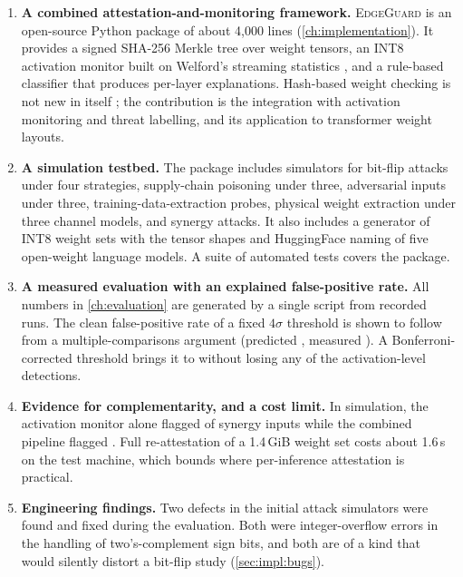 \begin{enumerate}[leftmargin=*]
  \item \textbf{A combined attestation-and-monitoring framework.} \textsc{EdgeGuard} is an
        open-source Python package of about 4{,}000 lines (\cref{ch:implementation}). It
        provides a signed SHA-256 Merkle tree over weight tensors, an INT8 activation monitor
        built on Welford's streaming statistics \cite{welford1962note}, and a rule-based
        classifier that produces per-layer explanations. Hash-based weight checking is not new
        in itself \cite{javaheripi2021hashtag,guo2021modelshield}; the contribution is the
        integration with activation monitoring and threat labelling, and its application to
        transformer weight layouts.
  \item \textbf{A simulation testbed.} The package includes simulators for bit-flip attacks
        under four strategies, supply-chain poisoning under three, adversarial inputs under
        three, training-data-extraction probes, physical weight extraction under three channel
        models, and synergy attacks. It also includes a generator of INT8 weight sets with the
        tensor shapes and HuggingFace naming of five open-weight language models. A suite of
        \NTests{} automated tests covers the package.
  \item \textbf{A measured evaluation with an explained false-positive rate.} All numbers in
        \cref{ch:evaluation} are generated by a single script from recorded runs. The clean
        false-positive rate of a fixed $4\sigma$ threshold is shown to follow from a
        multiple-comparisons argument (predicted \PredFPRZFour{}, measured \EmpFPRZFour{}). A
        Bonferroni-corrected threshold brings it to \EmpFPRBonf{} without losing any of the
        activation-level detections.
  \item \textbf{Evidence for complementarity, and a cost limit.} In simulation, the activation
        monitor alone flagged \MonSynergy{} of synergy inputs while the combined pipeline
        flagged \FlagSynergy{}. Full re-attestation of a 1.4\,GiB weight set costs about 1.6\,s
        on the test machine, which bounds where per-inference attestation is practical.
  \item \textbf{Engineering findings.} Two defects in the initial attack simulators were found
        and fixed during the evaluation. Both were integer-overflow errors in the handling of
        two's-complement sign bits, and both are of a kind that would silently distort a
        bit-flip study (\cref{sec:impl:bugs}).
\end{enumerate}

